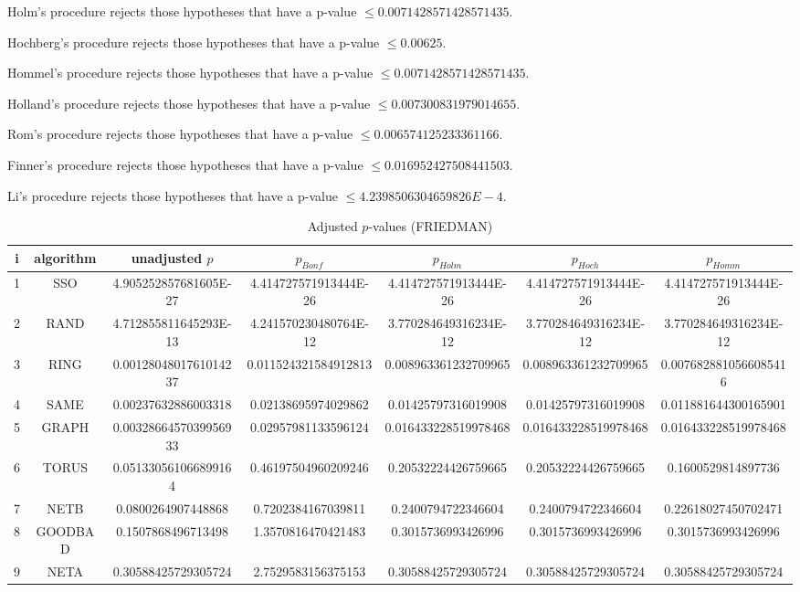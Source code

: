 \documentclass[a4paper,10pt]{article}
\begin{document}
\begin{landscape}
Holm's procedure rejects those hypotheses that have a p-value $\le0.0071428571428571435$.


Hochberg's procedure rejects those hypotheses that have a p-value $\le0.00625$.


Hommel's procedure rejects those hypotheses that have a p-value $\le0.0071428571428571435$.


Holland's procedure rejects those hypotheses that have a p-value $\le0.007300831979014655$.


Rom's procedure rejects those hypotheses that have a p-value $\le0.006574125233361166$.


Finner's procedure rejects those hypotheses that have a p-value $\le0.016952427508441503$.


Li's procedure rejects those hypotheses that have a p-value $\le4.2398506304659826E-4$.



\newpage

\begin{table}[!htp]
\centering\scriptsize
\caption{Adjusted $p$-values (FRIEDMAN)}
\begin{tabular}{ccccccc}
i&algorithm&unadjusted $p$&$p_{Bonf}$&$p_{Holm}$&$p_{Hoch}$&$p_{Homm}$\\
\hline
1& SSO&4.905252857681605E-27&4.414727571913444E-26&4.414727571913444E-26&4.414727571913444E-26&4.414727571913444E-26\\
2& RAND&4.712855811645293E-13&4.241570230480764E-12&3.770284649316234E-12&3.770284649316234E-12&3.770284649316234E-12\\
3& RING&0.0012804801761014237&0.011524321584912813&0.008963361232709965&0.008963361232709965&0.0076828810566085416\\
4& SAME&0.00237632886003318&0.02138695974029862&0.01425797316019908&0.01425797316019908&0.011881644300165901\\
5& GRAPH&0.0032866457039956933&0.02957981133596124&0.016433228519978468&0.016433228519978468&0.016433228519978468\\
6& TORUS&0.051330561066899164&0.46197504960209246&0.20532224426759665&0.20532224426759665&0.1600529814897736\\
7& NETB&0.0800264907448868&0.7202384167039811&0.2400794722346604&0.2400794722346604&0.22618027450702471\\
8& GOODBAD&0.1507868496713498&1.3570816470421483&0.3015736993426996&0.3015736993426996&0.3015736993426996\\
9& NETA&0.30588425729305724&2.7529583156375153&0.30588425729305724&0.30588425729305724&0.30588425729305724\\
\hline
\end{tabular}
\end{table}


\end{landscape}
\end{document}

